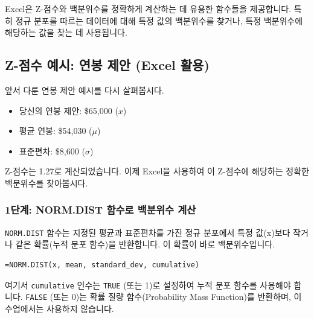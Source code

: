 \documentclass[11pt,a4paper]{book}
\theoremstyle{definition}
\begin{document}
Excel은 Z-점수와 백분위수를 정확하게 계산하는 데 유용한 함수들을 제공합니다. 특히 정규 분포를 따르는 데이터에 대해 특정 값의 백분위수를 찾거나, 특정 백분위수에 해당하는 값을 찾는 데 사용됩니다.

\subsection{Z-점수 예시: 연봉 제안 (Excel 활용)}

앞서 다룬 연봉 제안 예시를 다시 살펴봅시다.
\begin{itemize}
    \item 당신의 연봉 제안: \$65,000 (\(x\))
    \item 평균 연봉: \$54,030 (\(\mu\))
    \item 표준편차: \$8,600 (\(\sigma\))
\end{itemize}
Z-점수는 1.27로 계산되었습니다. 이제 Excel을 사용하여 이 Z-점수에 해당하는 정확한 백분위수를 찾아봅시다.

\subsubsection*{1단계: NORM.DIST 함수로 백분위수 계산}

\texttt{NORM.DIST} 함수는 지정된 평균과 표준편차를 가진 정규 분포에서 특정 값(x)보다 작거나 같은 확률(누적 분포 함수)을 반환합니다. 이 확률이 바로 백분위수입니다.

\begin{lstlisting}[caption={NORM.DIST 함수 사용법}, label={lst:norm_dist}]
=NORM.DIST(x, mean, standard_dev, cumulative)
\end{lstlisting}
여기서 \texttt{cumulative} 인수는 \texttt{TRUE} (또는 1)로 설정하여 누적 분포 함수를 사용해야 합니다. \texttt{FALSE} (또는 0)는 확률 질량 함수(Probability Mass Function)를 반환하며, 이 수업에서는 사용하지 않습니다.
\end{document}
